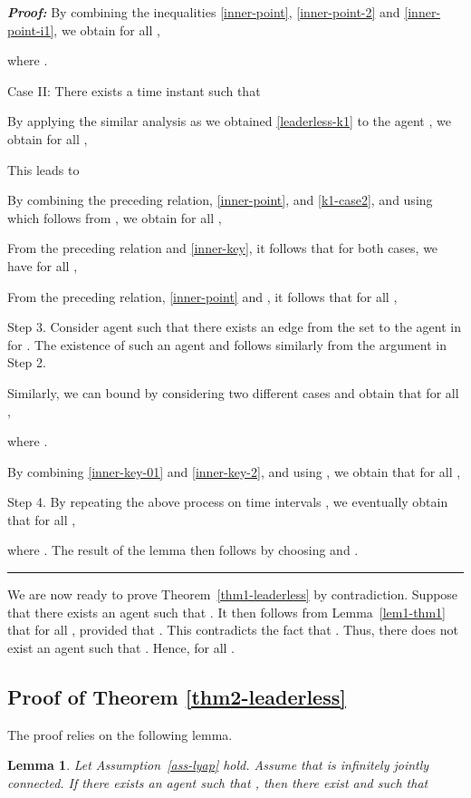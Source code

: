 \documentclass[a4paper, 11pt]{article}
\newtheorem{lemma}{Lemma}
\newenvironment{IEEEproof}[1][\bf Proof]{\smallskip\par\noindent\textit{#1: }}{\hspace*{\fill} \rule{6pt}{6pt}\smallskip}
\begin{document}
\begin{IEEEproof}
By combining the inequalities \eqref{inner-point}, \eqref{inner-point-2} and \eqref{inner-point-i1}, we obtain for all ,

where .

Case II: There exists a time instant  such that

By applying the similar analysis as we obtained \eqref{leaderless-k1}
to the agent , we obtain for all ,

This leads to

By combining the preceding relation, \eqref{inner-point}, and \eqref{k1-case2}, and using  which follows from , we obtain for all  ,

From the preceding relation and \eqref{inner-key}, it follows that for both cases, we have
for all  ,

From the preceding relation, \eqref{inner-point} and ,
it follows that for all ,




\vspace{2mm}

\noindent Step 3. Consider agent  such that there exists an edge from the set  to the agent  in  for .
The existence of such an agent  and  follows similarly from the argument in Step 2.

Similarly, we can bound  by considering two different cases and obtain that
for all ,

where .

By combining \eqref{inner-key-01} and \eqref{inner-key-2}, and using ,
we obtain that for all ,


\vspace{2mm}

\noindent Step 4. By repeating the above process on
time intervals ,
we eventually obtain that for all ,

where .
The result of the lemma then follows by choosing  and .
\end{IEEEproof}

We are now ready to prove Theorem~\ref{thm1-leaderless} by contradiction.
Suppose that there exists an agent  such that
. It then follows from Lemma~\ref{lem1-thm1} that 
for all , provided that .
This contradicts the fact that .
Thus, there does not exist an agent  such that . Hence,  for all .

\subsection{Proof of Theorem \ref{thm2-leaderless}}\label{proof-thm2-leaderless}
The proof relies on the following lemma.
\begin{lemma}\label{lem1-thm2}
Let Assumption~\ref{ass-lyap} hold. Assume that  is infinitely jointly connected.
If there exists an agent  such that
, then there exist  and  such that

\end{lemma}
\end{document}
